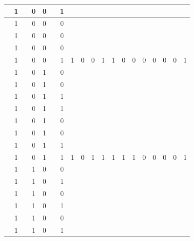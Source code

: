 \begin{table}[!tb]
\begin{tabular}{|c|c|c|c|c|c|c|c|c|c|c|c|c|c|c|c|c|c|c|}
        \rowcolor{yellow!40}  & 1 &  & 0 & 0 &  & 1 &  &  &  &  &  &  &  &  &  &  &  &  \\ \hline
        \rowcolor{yellow!40}  & 1 &  & 0 & 0 &  & 0 &  &  &  &  &  &  &  &  &  &  &  &  \\ \hline
        \rowcolor{yellow!40}  & 1 &  & 0 & 0 &  & 0 &  &  &  &  &  &  &  &  &  &  &  &  \\ \hline
        \rowcolor{yellow!40}  & 1 &  & 0 & 0 &  & 0 &  &  &  &  &  &  &  &  &  &  &  &  \\ \hline
        \rowcolor{yellow!40}  & 1 &  & 0 & 0 &  & 1 & 1 & 0 & 0 & 1 & 1 & 0 & 0 & 0 & 0 & 0 & 0 & 1 \\ \hline
        \rowcolor{gray!40}  & 1 &  & 0 & 1 &  & 0 &  &  &  &  &  &  &  &  &  &  &  &  \\ \hline
        \rowcolor{gray!40}  & 1 &  & 0 & 1 &  & 0 &  &  &  &  &  &  &  &  &  &  &  &  \\ \hline
        \rowcolor{gray!40}  & 1 &  & 0 & 1 &  & 1 &  &  &  &  &  &  &  &  &  &  &  &  \\ \hline
        \rowcolor{gray!40}  & 1 &  & 0 & 1 &  & 1 &  &  &  &  &  &  &  &  &  &  &  &  \\ \hline
        \rowcolor{gray!40}  & 1 &  & 0 & 1 &  & 0 &  &  &  &  &  &  &  &  &  &  &  &  \\ \hline
        \rowcolor{gray!40}  & 1 &  & 0 & 1 &  & 0 &  &  &  &  &  &  &  &  &  &  &  &  \\ \hline
        \rowcolor{gray!40}  & 1 &  & 0 & 1 &  & 1 &  &  &  &  &  &  &  &  &  &  &  &  \\ \hline
        \rowcolor{gray!40}  & 1 &  & 0 & 1 &  & 1 & 1 & 0 & 1 & 1 & 1 & 1 & 1 & 0 & 0 & 0 & 0 & 1 \\ \hline
        \rowcolor{blue!40}  & 1 &  & 1 & 0 &  & 0 &  &  &  &  &  &  &  &  &  &  &  &  \\ \hline
        \rowcolor{blue!40}  & 1 &  & 1 & 0 &  & 1 &  &  &  &  &  &  &  &  &  &  &  &  \\ \hline
        \rowcolor{blue!40}  & 1 &  & 1 & 0 &  & 0 &  &  &  &  &  &  &  &  &  &  &  &  \\ \hline
        \rowcolor{blue!40}  & 1 &  & 1 & 0 &  & 1 &  &  &  &  &  &  &  &  &  &  &  &  \\ \hline
        \rowcolor{blue!40}  & 1 &  & 1 & 0 &  & 0 &  &  &  &  &  &  &  &  &  &  &  &  \\ \hline
        \rowcolor{blue!40}  & 1 &  & 1 & 0 &  & 1 &  &  &  &  &  &  &  &  &  &  &  &  \\ \hline

\end{tabular}
\end{table}

